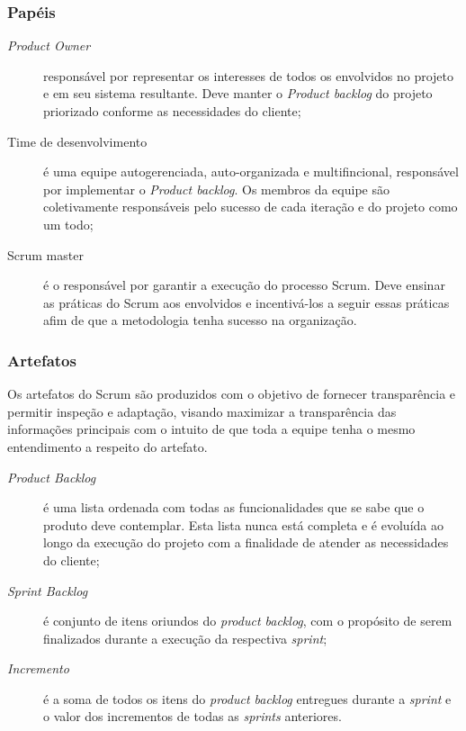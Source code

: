 \subsubsection{Papéis}

\begin{description}
    \item[\textit{Product Owner}] responsável por representar os interesses de
    todos os envolvidos no projeto e em seu sistema resultante. Deve manter o
    \textit{Product backlog} do projeto priorizado conforme as necessidades do cliente;
    \item[Time de desenvolvimento] é uma equipe autogerenciada, auto-organizada e
    multifincional, responsável por implementar o \textit{Product backlog}. Os
    membros da equipe são coletivamente responsáveis pelo sucesso de cada iteração
    e do projeto como um todo;
    \item[Scrum master] é o responsável por garantir a execução do processo Scrum.
    Deve ensinar as práticas do Scrum aos envolvidos e incentivá-los a seguir essas
    práticas afim de que a metodologia tenha sucesso na organização.
\end{description}

\subsubsection{Artefatos}

Os artefatos do Scrum são produzidos com o objetivo de fornecer transparência e
permitir inspeção e adaptação, visando maximizar a transparência das informações
principais com o intuito de que toda a equipe tenha o mesmo entendimento a respeito
do artefato.

\begin{description}
    \item[\textit{Product Backlog}] é uma lista ordenada com todas as funcionalidades
    que se sabe que o produto deve contemplar. Esta lista nunca está completa e é
    evoluída ao longo da execução do projeto com a finalidade de atender as necessidades
    do cliente;
    \item[\textit{Sprint Backlog}] é conjunto de itens oriundos do \textit{product backlog},
    com o propósito de serem finalizados durante a execução da respectiva \textit{sprint};
    \item[\textit{Incremento}] é a soma de todos os itens do \textit{product backlog}
    entregues durante a \textit{sprint} e o valor dos incrementos de todas as \textit{sprints}
    anteriores.
\end{description}

